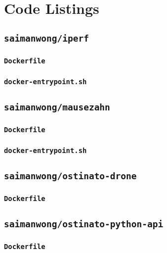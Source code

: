 \chapter{Code Listings}\label{app:code}

\section{\texttt{saimanwong/iperf}} \label{code:iperf}
\subsection{\texttt{Dockerfile}}

\subsection{\texttt{docker-entrypoint.sh}}


\clearpage
\section{\texttt{saimanwong/mausezahn}}\label{code:mausezahn}
\subsection{\texttt{Dockerfile}}

\clearpage
\subsection{\texttt{docker-entrypoint.sh}}


\clearpage
\section{\texttt{saimanwong/ostinato-drone}}\label{code:ostinato-drone}
\subsection{\texttt{Dockerfile}}


\clearpage
\section{\texttt{saimanwong/ostinato-python-api}}\label{code:ostinato-python-api}
\subsection{\texttt{Dockerfile}}

